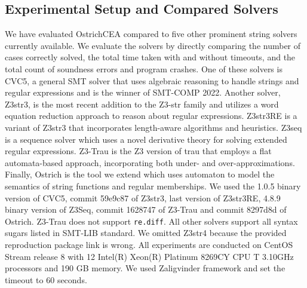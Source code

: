 \subsection{Experimental Setup and Compared Solvers}
We have evaluated OstrichCEA compared to five other prominent string solvers currently available. We evaluate the solvers by directly comparing the number of cases correctly solved, the total time taken with and without timeouts, and the total count of soundness errors and program crashes. One of these solvers is CVC5\cite{cvc5}, a general SMT solver that uses algebraic reasoning to handle strings and regular expressions and is the winner of SMT-COMP 2022\cite{smt-comp}. Another solver, Z3str3\cite{z3str3}, is the most recent addition to the Z3-str family and utilizes a word equation reduction approach to reason about regular expressions. Z3str3RE\cite{z3str3re} is a variant of Z3str3 that incorporates length-aware algorithms and heuristics. Z3seq\cite{z3seq} is a sequence solver which uses a novel derivative theory for solving extended regular expressions. Z3-Trau\cite{z3trau} is the Z3 version of trau\cite{trau} that employs a flat automata-based approach, incorporating both under- and over-approximations. Finally, Ostrich\cite{ostrich} is the tool we extend which uses automaton to model the semantics of string functions and regular memberships. We used the 1.0.5 binary version of CVC5, commit 59e9c87 of Z3str3, last version of Z3str3RE, 4.8.9 binary version of Z3Seq, commit 1628747 of Z3-Trau and commit 8297d8d of Ostrich. Z3-Trau does not support \verb|re.diff|. All other solvers support all syntax sugars listed in SMT-LIB standard\cite{smt_lib}. We omitted Z3str4\cite{z3str4} because the provided reproduction package link is wrong. All experiments are conducted on CentOS Stream release 8 with 12 Intel(R) Xeon(R) Platinum 8269CY CPU T 3.10GHz processors and 190 GB memory. We used Zaligvinder\cite{zaligvinder_2021} framework and set the timeout to 60 seconds. 
